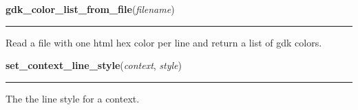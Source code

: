     \label{pygtk_chart:basics:gdk_color_list_from_file}

    \vspace{0.5ex}

\hspace{.8\funcindent}\begin{boxedminipage}{\funcwidth}

    \raggedright \textbf{gdk\_color\_list\_from\_file}(\textit{filename})

    \vspace{-1.5ex}

    \rule{\textwidth}{0.5\fboxrule}
\setlength{\parskip}{2ex}
    Read a file with one html hex color per line and return a list of gdk 
    colors.

\setlength{\parskip}{1ex}
    \end{boxedminipage}

    \label{pygtk_chart:basics:set_context_line_style}

    \vspace{0.5ex}

\hspace{.8\funcindent}\begin{boxedminipage}{\funcwidth}

    \raggedright \textbf{set\_context\_line\_style}(\textit{context}, \textit{style})

    \vspace{-1.5ex}

    \rule{\textwidth}{0.5\fboxrule}
\setlength{\parskip}{2ex}
    The the line style for a context.

\setlength{\parskip}{1ex}
    \end{boxedminipage}

